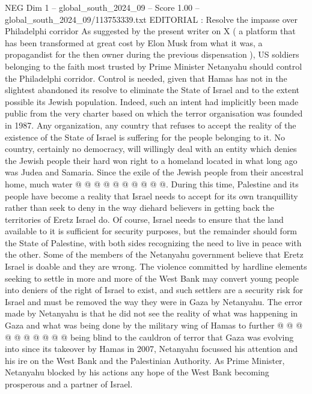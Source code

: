 \begin{textsample}{NEG Dim 1 – global\_south\_2024\_09 – Score 1.00 – global\_south\_2024\_09/113753339.txt}  \label{ex:f1_neg_423}
EDITORIAL : Resolve the impasse over Philadelphi corridor As suggested by the present writer on X ( a platform that has been transformed at great cost by Elon Musk from what it was, a propagandist for the then owner during the previous dispensation ), US soldiers belonging to the faith most trusted by Prime Minister Netanyahu should control the Philadelphi corridor.
Control is needed, given that Hamas has not in the slightest abandoned its resolve to eliminate the State of Israel and to the extent possible its Jewish population.
Indeed, such an intent had implicitly been made public from the very charter based on which the terror organisation was founded in 1987.
Any organization, any country that refuses to accept the reality of the existence of the State of Israel is suffering for the people belonging to it.
No country, certainly no democracy, will willingly deal with an entity which denies the Jewish people their hard won right to a homeland located in what long ago was Judea and Samaria.
Since the exile of the Jewish people from their ancestral home, much water @ @ @ @ @ @ @ @ @ @.
During this time, Palestine and its people have become a reality that Israel needs to accept for its own tranquillity rather than seek to deny in the way diehard believers in getting back the territories of Eretz Israel do.
Of course, Israel needs to ensure that the land available to it is sufficient for security purposes, but the remainder should form the State of Palestine, with both sides recognizing the need to live in peace with the other.
Some of the members of the Netanyahu government believe that Eretz Israel is doable and they are wrong.
The violence committed by hardline elements seeking to settle in more and more of the West Bank may convert young people into deniers of the right of Israel to exist, and such settlers are a security risk for Israel and must be removed the way they were in Gaza by Netanyahu.
The error made by Netanyahu is that he did not see the reality of what was happening in Gaza and what was being done by the military wing of Hamas to further @ @ @ @ @ @ @ @ @ @ being blind to the cauldron of terror that Gaza was evolving into since its takeover by Hamas in 2007, Netanyahu focussed his attention and his ire on the West Bank and the Palestinian Authority.
As Prime Minister, Netanyahu blocked by his actions any hope of the West Bank becoming prosperous and a partner of Israel.

\end{textsample}
